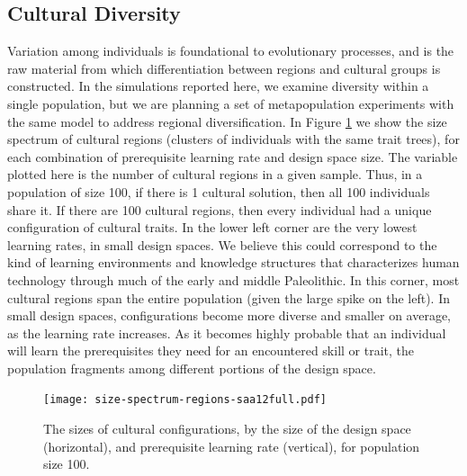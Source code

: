 \documentclass[referee,graybox,natbib]{svmult}
\begin{document}
\subsection{Cultural Diversity}\label{cultural-diversity}

Variation among individuals is foundational to evolutionary processes,
and is the raw material from which differentiation between regions and
cultural groups is constructed. In the simulations reported here, we
examine diversity within a single population, but we are planning a set
of metapopulation experiments with the same model to address regional
diversification. In Figure \ref{img:size-spectrum-cultures-100} we show
the size spectrum of cultural regions (clusters of individuals with the
same trait trees), for each combination of prerequisite learning rate
and design space size. The variable plotted here is the number of
cultural regions in a given sample. Thus, in a population of size 100,
if there is 1 cultural solution, then all 100 individuals share it. If
there are 100 cultural regions, then every individual had a unique
configuration of cultural traits. In the lower left corner are the very
lowest learning rates, in small design spaces. We believe this could
correspond to the kind of learning environments and knowledge structures
that characterizes human technology through much of the early and middle
Paleolithic. In this corner, most cultural regions span the entire
population (given the large spike on the left). In small design spaces,
configurations become more diverse and smaller on average, as the
learning rate increases. As it becomes highly probable that an
individual will learn the prerequisites they need for an encountered
skill or trait, the population fragments among different portions of the
design space.

\begin{figure}[htbp] 
    \centering
    \texttt{[image: size-spectrum-regions-saa12full.pdf]}
    \caption{The sizes of cultural configurations, by the size of the design space (horizontal), and prerequisite learning rate (vertical), for population size 100.}
    \label{img:size-spectrum-cultures-100}
\end{figure}
\end{document}
